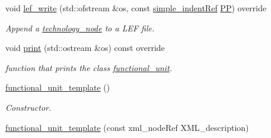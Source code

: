 \begin{DoxyCompactItemize}
void \hyperlink{structfunctional__unit__template_a9dfb2331936da0d6c56ac8e80312b95b}{lef\+\_\+write} (std\+::ofstream \&os, const \hyperlink{simple__indent_8hpp_ad85cff64e49d5dbf5cefe96f411c720e}{simple\+\_\+indent\+Ref} \hyperlink{structtechnology__node_ae6edfff0ccd2700b5de9fb538536977a}{PP}) override
\begin{DoxyCompactList}\small\item\em Append a \hyperlink{structtechnology__node}{technology\+\_\+node} to a L\+EF file. \end{DoxyCompactList}\item 
void \hyperlink{structfunctional__unit__template_a4618e5113fff69a045ebc7f974e843b2}{print} (std\+::ostream \&os) const override
\begin{DoxyCompactList}\small\item\em function that prints the class \hyperlink{structfunctional__unit}{functional\+\_\+unit}. \end{DoxyCompactList}\end{DoxyCompactItemize}
\textbf{ }\par
\begin{DoxyCompactItemize}
\item 
\hyperlink{structfunctional__unit__template_aaca95387a7e1504f7de69bc26b73b090}{functional\+\_\+unit\+\_\+template} ()
\begin{DoxyCompactList}\small\item\em Constructor. \end{DoxyCompactList}\item 
\hyperlink{structfunctional__unit__template_ad98035d562f4f5706ec8698e09144105}{functional\+\_\+unit\+\_\+template} (const xml\+\_\+node\+Ref X\+M\+L\+\_\+description)
\end{DoxyCompactItemize}

